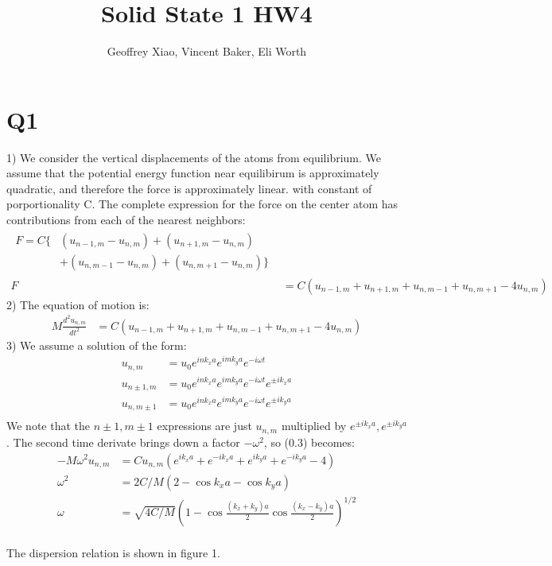 \documentclass[a4paper,11pt]{article}
\title{Solid State 1 HW4}
\author{Geoffrey Xiao, Vincent Baker, Eli Worth}
\numberwithin{equation}{section}
\newcommand{\lrp}[1]{\left({#1}\right)}
\begin{document}
\maketitle

\section*{Q1}
1) We consider the vertical displacements of the atoms from equilibrium.
We assume that the potential energy function near equilibirum is approximately quadratic, and therefore the force is approximately linear.
with constant of porportionality C. 
The complete expression for the force on the center atom has contributions from each of the nearest neighbors:
\begin{align}
 \begin{split}
 F = C\{&(u_{n-1,m}-u_{n,m})+(u_{n+1,m}-u_{n,m})\\
      &+(u_{n,m-1}-u_{n,m})+(u_{n,m+1}-u_{n,m})\}
 \end{split}\\
 F &= C\lrp{u_{n-1,m}+u_{n+1,m}+u_{n,m-1}+u_{n,m+1}-4u_{n,m}}
\end{align}
2) The equation of motion is:
\begin{align}
 M\frac{d^2u_{n,m}}{dt^2} &= C\lrp{u_{n-1,m}+u_{n+1,m}+u_{n,m-1}+u_{n,m+1}-4u_{n,m}}
\end{align}
3) We assume a solution of the form:
\begin{align}
 u_{n,m} &= u_0e^{ink_xa}e^{imk_ya}e^{-i\omega t}\\
 u_{n\pm1,m} &= u_0e^{ink_xa}e^{imk_ya}e^{-i\omega t}e^{\pm ik_xa}\\
 u_{n,m\pm 1} &= u_0e^{ink_xa}e^{imk_ya}e^{-i\omega t}e^{\pm ik_ya}\\
\end{align}
We note that the $n\pm 1, m\pm 1$ expressions are just $u_{n,m}$ multiplied by $e^{\pm ik_xa},e^{\pm ik_ya}$.
The second time derivate brings down a factor $-\omega^2$, so (0.3) becomes:
\begin{align}
 -M\omega^2u_{n,m} &= Cu_{n,m}\lrp{e^{ik_xa}+e^{-ik_xa}+e^{ik_ya}+e^{-ik_ya}-4}\\
 \omega^2 &= 2C/M\lrp{2-\cos{k_xa}-\cos{k_ya}}\\
 \omega &= \sqrt{4C/M}\lrp{1-\cos{\frac{(k_x+k_y)a}{2}}\cos{\frac{(k_x-k_y)a}{2}} }^{1/2}
\end{align}
\\
The dispersion relation is shown in figure 1.
\end{document}
